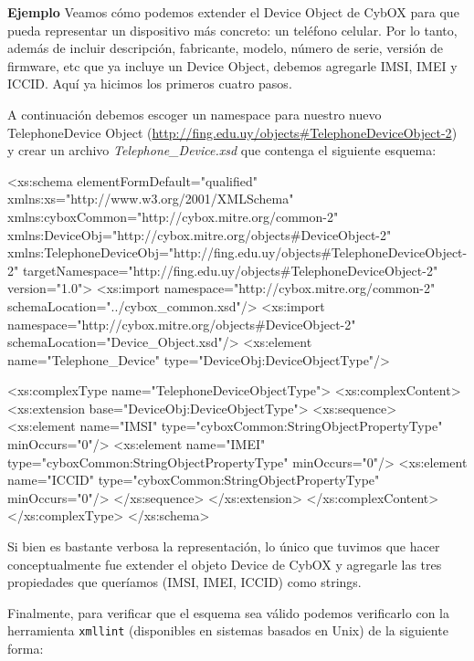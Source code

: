 \textbf{Ejemplo}
Veamos cómo podemos extender el Device Object de CybOX para que pueda representar un dispositivo más concreto: un teléfono celular. Por lo tanto, además de incluir descripción, fabricante, modelo, número de serie, versión de firmware, etc que ya incluye un Device Object, debemos agregarle IMSI, IMEI y ICCID. Aquí ya hicimos los primeros cuatro pasos.

A continuación debemos escoger un namespace para nuestro nuevo TelephoneDevice Object (\url{http://fing.edu.uy/objects\#TelephoneDeviceObject-2}) y crear un archivo \emph{Telephone\_Device.xsd} que contenga el siguiente esquema:
\newline

\begin{xml}
<xs:schema elementFormDefault="qualified"
  xmlns:xs="http://www.w3.org/2001/XMLSchema"
  xmlns:cyboxCommon="http://cybox.mitre.org/common-2"
  xmlns:DeviceObj="http://cybox.mitre.org/objects#DeviceObject-2"
  xmlns:TelephoneDeviceObj="http://fing.edu.uy/objects#TelephoneDeviceObject-2"
  targetNamespace="http://fing.edu.uy/objects#TelephoneDeviceObject-2"
  version="1.0">
  <xs:import namespace="http://cybox.mitre.org/common-2" schemaLocation="../cybox_common.xsd"/>
  <xs:import namespace="http://cybox.mitre.org/objects#DeviceObject-2" schemaLocation="Device_Object.xsd"/>
  <xs:element name="Telephone_Device" type="DeviceObj:DeviceObjectType"/>

  <xs:complexType name="TelephoneDeviceObjectType">
    <xs:complexContent>
      <xs:extension base="DeviceObj:DeviceObjectType">
        <xs:sequence>
          <xs:element name="IMSI" type="cyboxCommon:StringObjectPropertyType" minOccurs="0"/>
          <xs:element name="IMEI" type="cyboxCommon:StringObjectPropertyType" minOccurs="0"/>
          <xs:element name="ICCID" type="cyboxCommon:StringObjectPropertyType" minOccurs="0"/>
        </xs:sequence>
      </xs:extension>
    </xs:complexContent>
  </xs:complexType>
</xs:schema>
\end{xml}

Si bien es bastante verbosa la representación, lo único que tuvimos que hacer conceptualmente fue extender el objeto Device de CybOX y agregarle las tres propiedades que queríamos (IMSI, IMEI, ICCID) como strings.

Finalmente, para verificar que el esquema sea válido podemos verificarlo con la herramienta \texttt{xmllint} (disponibles en sistemas basados en Unix) de la siguiente forma:
\newline

